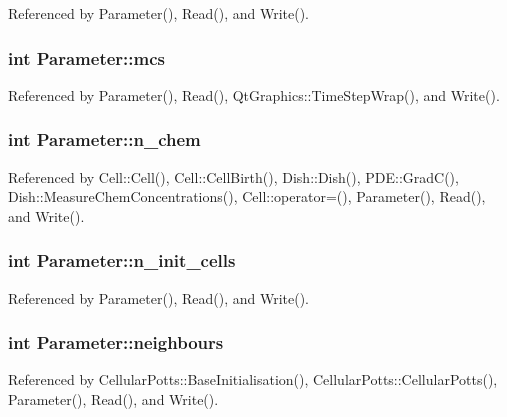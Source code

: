 Referenced by Parameter(), Read(), and Write().

\subsubsection[{mcs}]{\setlength{\rightskip}{0pt plus 5cm}int Parameter\-::mcs}\label{classParameter_a8990daa643bf7dce987b70dec133e051}


Referenced by Parameter(), Read(), Qt\-Graphics\-::\-Time\-Step\-Wrap(), and Write().

\subsubsection[{n\-\_\-chem}]{\setlength{\rightskip}{0pt plus 5cm}int Parameter\-::n\-\_\-chem}\label{classParameter_a9ab71e0a3c6c62f399a4e407ed873413}


Referenced by Cell\-::\-Cell(), Cell\-::\-Cell\-Birth(), Dish\-::\-Dish(), P\-D\-E\-::\-Grad\-C(), Dish\-::\-Measure\-Chem\-Concentrations(), Cell\-::operator=(), Parameter(), Read(), and Write().

\subsubsection[{n\-\_\-init\-\_\-cells}]{\setlength{\rightskip}{0pt plus 5cm}int Parameter\-::n\-\_\-init\-\_\-cells}\label{classParameter_a47b338bf43853dd9748507dc94031a77}


Referenced by Parameter(), Read(), and Write().

\subsubsection[{neighbours}]{\setlength{\rightskip}{0pt plus 5cm}int Parameter\-::neighbours}\label{classParameter_ac5e1853f89c4f29e764107a756adb01e}


Referenced by Cellular\-Potts\-::\-Base\-Initialisation(), Cellular\-Potts\-::\-Cellular\-Potts(), Parameter(), Read(), and Write().

